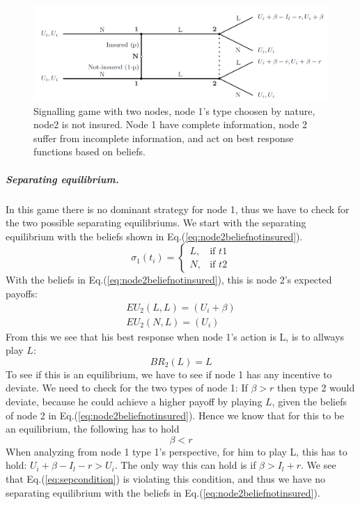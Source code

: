 \begin{figure}[h]
\centering

  \centering
\includegraphics[width=1\linewidth]{../Figures/SignalingGameNotInsured.png}

\caption{Signalling game with two nodes, node 1's type choosen by nature, node2 is not insured. Node 1 have complete information, node 2 suffer from incomplete information, and act on best response functions based on beliefs. \label{fig:signalingNotInsured}}

\end{figure}
\subparagraph{Separating equilibrium.}
In this game there is no dominant strategy for node 1, thus we have to check for the two possible separating equilibriums.
We start with the separating equilibrium with the beliefs shown in Eq.(\ref{eq:node2beliefnotinsured}).
\begin{equation}
    \sigma_{1}(t_{i})= 
\begin{cases}
   L,& \text{if } t1\\
   N,& \text{if } t2  
\end{cases}
\label{eq:node2beliefnotinsured}
\end{equation}
With the beliefs in Eq.(\ref{eq:node2beliefnotinsured}), this is node 2's expected payoffs:
\begin{eqnarray}
EU_{2}(L,L)=(U_{i}+\beta) \\
EU_{2}(N,L)=(U_{i})
\end{eqnarray}
From this we see that his best response when node 1's action is L, is to allways play $L$: \begin{equation}
BR_{2}(L)= L
\end{equation}
To see if this is an equilibrium, we have to see if node 1 has any incentive to deviate. 
We need to check for the two types of node 1:
If $\beta>r$ then type 2 would deviate, because he could achieve a higher payoff by playing $L$, given the beliefs of node 2 in Eq.(\ref{eq:node2beliefnotinsured}). Hence we know that for this to be an equilibrium, the following has to hold
\begin{equation}
\beta < r
\label{eq:sepcondition}
\end{equation}  
When analyzing from node 1 type 1's perspective, for him to play L, this has to hold: $U_{i}+\beta-I_{l}-r > U_{i}$. The only way this can hold is if $\beta>I_{l}+r$. We see that Eq.(\ref{eq:sepcondition}) is violating this condition, and thus we have no separating equilibrium with the beliefs in Eq.(\ref{eq:node2beliefnotinsured}).


